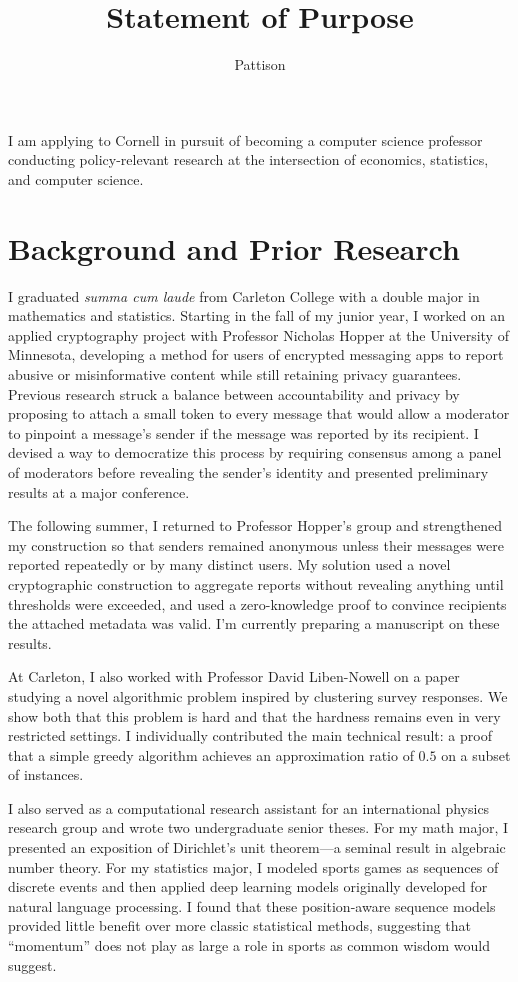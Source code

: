 \documentclass{grad-statement}
\author{Pattison}
\title{Statement of Purpose}
\begin{document}
\noindent
I am applying to Cornell in pursuit of becoming a computer science professor conducting policy-relevant research at the intersection of economics, statistics, and computer science.

\section{Background and Prior Research}

I graduated \emph{summa cum laude} from Carleton College with a double major in mathematics and statistics.
Starting in the fall of my junior year, I worked on an applied cryptography project with Professor Nicholas Hopper at the University of Minnesota, developing a method for users of encrypted messaging apps to report abusive or misinformative content while still retaining privacy guarantees.
Previous research struck a balance between accountability and privacy by proposing to attach a small token to every message that would allow a moderator to pinpoint a message's sender if the message was reported by its recipient.
I devised a way to democratize this process by requiring consensus among a panel of moderators before revealing the sender's identity and presented preliminary results at a major conference.

The following summer, I returned to Professor Hopper's group and strengthened my construction so that senders remained anonymous unless their messages were reported repeatedly or by many distinct users.
My solution used a novel cryptographic construction to aggregate reports without revealing anything until thresholds were exceeded, and used a zero-knowledge proof to convince recipients the attached metadata was valid.
I'm currently preparing a manuscript on these results.

At Carleton, I also worked with Professor David Liben-Nowell on a paper studying a novel algorithmic problem inspired by clustering survey responses.
We show both that this problem is hard and that the hardness remains even in very restricted settings.
I individually contributed the main technical result: a proof that a simple greedy algorithm achieves an approximation ratio of $0.5$ on a subset of instances.

I also served as a computational research assistant for an international physics research group and wrote two undergraduate senior theses.
For my math major, I presented an exposition of Dirichlet's unit theorem---a seminal result in algebraic number theory.
For my statistics major, I modeled sports games as sequences of discrete events and then applied deep learning models originally developed for natural language processing.
I found that these position-aware sequence models provided little benefit over more classic statistical methods, suggesting that ``momentum'' does not play as large a role in sports as common wisdom would suggest.
\end{document}
